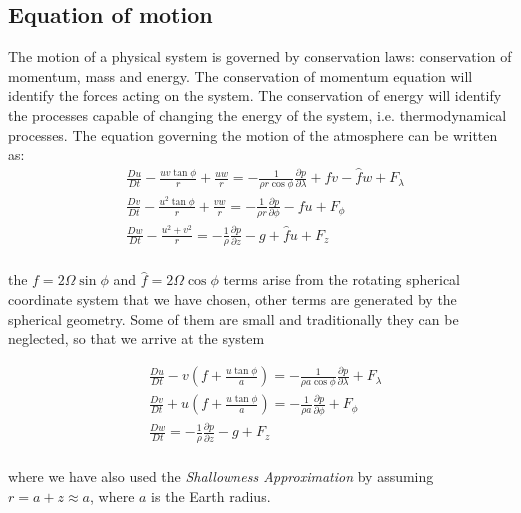 \subsection{Equation of motion} %
The motion of a physical system is governed by conservation laws: conservation of momentum, mass and energy. The conservation of momentum equation will identify the forces acting on the system. The conservation of energy will identify the processes capable of changing the energy of the system, i.e. thermodynamical processes.
The equation governing the motion of the atmosphere can be written as:
\[
	\begin{aligned}
		 & \frac{D u}{Dt} -\frac{uv \tan{\phi}}{r} +  \frac{uw}{r} = -\frac{1}{\rho r \cos{\phi}}\frac{\partial p}{\partial \lambda} + fv - \hat{f}w + F_\lambda \\
		 & \frac{D v}{Dt} -\frac{u^2 \tan{\phi}}{r} +  \frac{vw}{r} = -\frac{1}{\rho r }\frac{\partial p}{\partial \phi} - fu  + F_\phi                          \\
		 & \frac{D w}{Dt} -\frac{u^2+v^2}{r} = -\frac{1}{\rho }\frac{\partial p}{\partial z} -g +\hat{f}u + F_z                                                  \\
	\end{aligned}\]

the \(f=2\Omega \sin{\phi}\) and \(\hat{f} = 2\Omega\cos{\phi}\) terms arise from the rotating spherical coordinate system that we have chosen, other terms are generated by the spherical geometry. Some of them are small and traditionally they can be neglected, so that we arrive at the system

\[\begin{aligned}
		 & \frac{D u}{Dt} - v\left(f +  \frac{u \tan{\phi}}{a}\right)  = -\frac{1}{\rho a \cos{\phi}}\frac{\partial p}{\partial \lambda}   + F_\lambda \\
		 & \frac{D v}{Dt} + u\left( f + \frac{u \tan{\phi}}{a}\right)  = -\frac{1}{\rho a}\frac{\partial p}{\partial \phi}  + F_\phi                   \\
		 & \frac{D w}{Dt}  = -\frac{1}{\rho }\frac{\partial p}{\partial z} -g  + F_z                                                                   \\
	\end{aligned}\]

where we have also used the \emph{Shallowness Approximation} by assuming \(r = a +z \approx a\), where \(a\) is the Earth radius.

